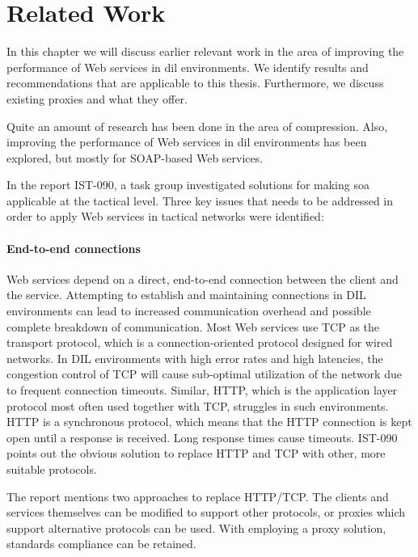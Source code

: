 \chapter{Related Work}

In this chapter we will discuss earlier relevant work in the area of improving
the performance of Web services in \gls{dil} environments. We identify results
and recommendations that are applicable to this thesis. Furthermore, we discuss
existing proxies and what they offer.

Quite an amount of research has been done in the area of compression. Also,
improving the performance of Web services in \gls{dil} environments has been
explored, but mostly for SOAP-based Web services.

In the report IST-090, a task group investigated solutions for making \gls{soa}
applicable at the tactical level. Three key issues that needs to be addressed in
order to apply Web services in tactical networks were
identified\cite{ist-118,ist-090}:

\label{section:DIL-problems}

\subsubsection{End-to-end connections}

Web services depend on a direct, end-to-end connection between the client and
the service. Attempting to establish and maintaining connections in DIL
environments can lead to increased communication overhead and possible complete
breakdown of communication. Most Web services use TCP as the transport protocol,
which is a connection-oriented protocol designed for wired networks. In DIL
environments with high error rates and high latencies, the congestion control of
TCP will cause sub-optimal utilization of the network due to frequent connection
timeouts. Similar, HTTP, which is the application layer protocol most often
used together with TCP, struggles in such environments. HTTP is a synchronous
protocol, which means that the HTTP connection is kept open until a response is
received. Long response times cause timeouts. IST-090 points out the obvious
solution to replace HTTP and TCP with other, more suitable protocols.

The report\cite{ist-090} mentions two approaches to replace HTTP/TCP. The
clients and services themselves can be modified to support other protocols, or
proxies which support alternative protocols can be used. With employing a proxy
solution, standards compliance can be retained.


